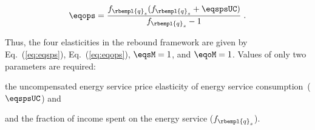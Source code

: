 \begin{equation} \label{eq:eqops}
  \eqops = \frac{f_{\rbempl{q}_s} (f_{\rbempl{q}_s} + \eqspsUC)}{f_{\rbempl{q}_s}-1} \; .
\end{equation}

Thus, the four elasticities in the rebound framework are given by
Eq.~(\ref{eq:eqsps}), 
Eq.~(\ref{eq:eqops}), 
$\eqsM = 1$, and 
$\eqoM = 1$.
Values of only two parameters are required:
%
\begin{enumerate*}[label={(\alph*)}]
	
  \item the uncompensated energy service price elasticity of energy service consumption~($\eqspsUC$) and
  
  \item and the fraction of income spent on the energy service ($f_{\rbempl{q}_s}$).
    
\end{enumerate*}

